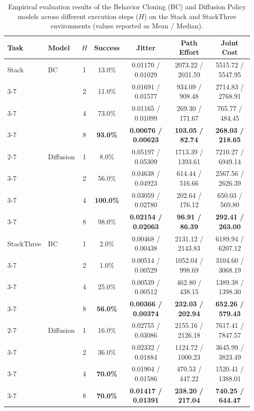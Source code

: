 \documentclass[11pt,a4paper]{article}
\begin{document}
\begin{table}[htbp]
\centering
\small
\caption{Empirical evaluation results of the Behavior Cloning (BC) and Diffusion Policy models across different execution steps ($H$) on the Stack and StackThree environments (values reported as Mean / Median).}
\label{tab:results}
\begin{tabular}{|l|l|c|c|c|c|c|}
\hline
\textbf{Task} & \textbf{Model} & \textbf{$H$} & \textbf{Success} & \textbf{Jitter} & \textbf{Path Effort} & \textbf{Joint Cost} \\ \hline
Stack & BC & 1 & 13.0\% & 0.01170 / 0.01029 & 2073.22 / 2031.59 & 5515.72 / 5547.95 \\ \cline{3-7}
 &  & 2 & 11.0\% & 0.01691 / 0.01577 & 934.09 / 908.48 & 2714.83 / 2768.91 \\ \cline{3-7}
 &  & 4 & 73.0\% & 0.01165 / 0.01099 & 269.30 / 171.67 & 765.77 / 484.45 \\ \cline{3-7}
 &  & 8 & \textbf{93.0\%} & \textbf{0.00676 / 0.00623} & \textbf{103.05 / 82.74} & \textbf{268.03 / 218.65} \\ \cline{2-7}
 & Diffusion & 1 & 8.0\% & 0.05197 / 0.05309 & 1713.39 / 1393.61 & 7210.27 / 6949.14 \\ \cline{3-7}
 &  & 2 & 56.0\% & 0.04638 / 0.04923 & 614.44 / 516.66 & 2567.56 / 2626.39 \\ \cline{3-7}
 &  & 4 & \textbf{100.0\%} & 0.03059 / 0.02780 & 202.64 / 176.12 & 650.03 / 569.80 \\ \cline{3-7}
 &  & 8 & 98.0\% & \textbf{0.02154 / 0.02063} & \textbf{96.91 / 86.39} & \textbf{292.41 / 263.00} \\ \hline
StackThree & BC & 1 & 2.0\% & 0.00468 / 0.00438 & 2131.12 / 2143.83 & 6189.94 / 6207.12 \\ \cline{3-7}
 &  & 2 & 1.0\% & 0.00514 / 0.00529 & 1052.04 / 998.69 & 3104.60 / 3068.19 \\ \cline{3-7}
 &  & 4 & 25.0\% & 0.00539 / 0.00512 & 462.80 / 438.15 & 1389.38 / 1398.30 \\ \cline{3-7}
 &  & 8 & \textbf{56.0\%} & \textbf{0.00366 / 0.00374} & \textbf{232.03 / 202.94} & \textbf{652.26 / 579.43} \\ \cline{2-7}
 & Diffusion & 1 & 16.0\% & 0.02755 / 0.03086 & 2155.16 / 2126.18 & 7617.41 / 7847.57 \\ \cline{3-7}
 &  & 2 & 36.0\% & 0.02332 / 0.01884 & 1124.72 / 1000.23 & 3645.99 / 3823.49 \\ \cline{3-7}
 &  & 4 & \textbf{70.0\%} & 0.01904 / 0.01586 & 470.53 / 447.22 & 1520.41 / 1388.01 \\ \cline{3-7}
 &  & 8 & \textbf{70.0\%} & \textbf{0.01417 / 0.01391} & \textbf{238.20 / 217.04} & \textbf{740.25 / 644.47} \\ \hline
\end{tabular}
\end{table}
\end{document}
